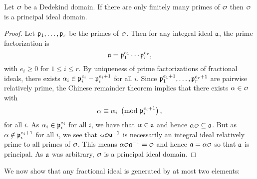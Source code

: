     \begin{proposition}\label{prop:Dedekind_with_finite_primes_is_PID}
      Let $\smc{O}$ be a Dedekind domain. If there are only finitely many primes of $\smc{O}$ then $\smc{O}$ is a principal ideal domain.
    \end{proposition}
    \begin{proof}
      Let $\mathfrak{p}_{1},\ldots,\mathfrak{p}_{r}$ be the primes of $\smc{O}$. Then for any integral ideal $\mathfrak{a}$, the prime factorization is
      \[
        \mathfrak{a} = \mathfrak{p}_{1}^{e_{1}} \cdots \mathfrak{p}_{r}^{e_{r}},
      \]
      with $e_{i} \ge 0$ for $1 \le i \le r$. By uniqueness of prime factorizations of fractional ideals, there exists $\alpha_{i} \in \mathfrak{p}_{i}^{e_{i}}-\mathfrak{p}_{i}^{e_{i}+1}$ for all $i$. Since $\mathfrak{p}_{1}^{e_{1}+1},\ldots,\mathfrak{p}_{r}^{e_{r}+1}$ are pairwise relatively prime, the Chinese remainder theorem implies that there exists $\a \in \smc{O}$ with 
      \[
        \alpha \equiv \alpha_{i} \ \left(\text{mod }\mathfrak{p}_{i}^{e_{i}+1}\right),
      \]
      for all $i$. As $\alpha_{i} \in \mathfrak{p}_{i}^{e_{i}}$ for all $i$, we have that $\alpha \in \mathfrak{a}$ and hence $\a\smc{O} \subseteq \mf{a}$. But as $\alpha \notin \mathfrak{p}_{i}^{e_{i}+1}$ for all $i$, we see that $\a\smc{O}\mf{a}^{-1}$ is necessarily an integral ideal relatively prime to all primes of $\smc{O}$. This means $\a\smc{O}\mf{a}^{-1} = \smc{O}$ and hence $\mf{a} = \a\smc{O}$ so that $\mathfrak{a}$ is principal. As $\mathfrak{a}$ was arbitrary, $\smc{O}$ is a principal ideal domain.
    \end{proof}
    
    We now show that any fractional ideal is generated by at most two elements:


